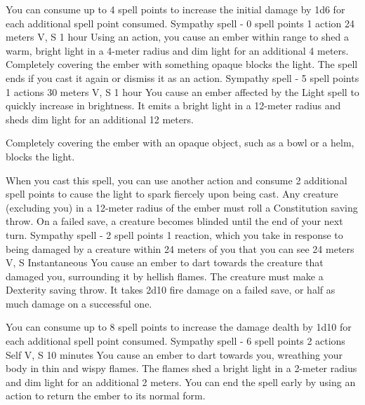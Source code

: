         You can consume up to 4 spell points to increase the initial damage by 1d6 for each additional spell point consumed.
        {Sympathy spell - 0 spell points}
        {1 action}
        {24 meters}
        {V, S}
        {1 hour}
        Using an action, you cause an ember within range to shed a warm, bright light in a 4-meter radius and dim light for an additional 4 meters.
        Completely covering the ember with something opaque blocks the light.
        The spell ends if you cast it again or dismiss it as an action.
        {Sympathy spell - 5 spell points}
        {1 actions}
        {30 meters}
        {V, S}
        {1 hour}
        You cause an ember affected by the Light spell to quickly increase in brightness.
        It emits a bright light in a 12-meter radius and sheds dim light for an additional 12 meters.

        Completely covering the ember with an opaque object, such as a bowl or a helm, blocks the light.

        When you cast this spell, you can use another action and consume 2 additional spell points to cause the light to spark fiercely upon being cast.
        Any creature (excluding you) in a 12-meter radius of the ember must roll a Constitution saving throw.
        On a failed save, a creature becomes blinded until the end of your next turn.
        {Sympathy spell - 2 spell points}
        {1 reaction, which you take in response to being damaged by a creature within 24 meters of you that you can see}
        {24 meters}
        {V, S}
        {Instantaneous}
        You cause an ember to dart towards the creature that damaged you, surrounding it by hellish flames.
        The creature must make a Dexterity saving throw.
        It takes 2d10 fire damage on a failed save, or half as much damage on a successful one.

        You can consume up to 8 spell points to increase the damage dealth by 1d10 for each additional spell point consumed.
        {Sympathy spell - 6 spell points}
        {2 actions}
        {Self}
        {V, S}
        {10 minutes}
        You cause an ember to dart towards you, wreathing your body in thin and wispy flames.
        The flames shed a bright light in a 2-meter radius and dim light for an additional 2 meters.
        You can end the spell early by using an action to return the ember to its normal form.


